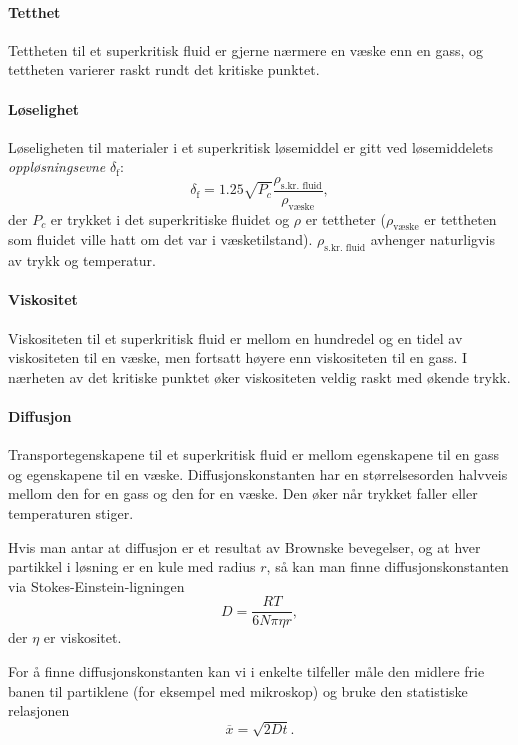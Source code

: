 \paragraph{Tetthet} Tettheten til et superkritisk fluid er gjerne nærmere en væske enn en gass, og tettheten varierer raskt rundt det kritiske punktet.

\paragraph{Løselighet} Løseligheten til materialer i et superkritisk løsemiddel er gitt ved løsemiddelets \emph{oppløsningsevne} $\delta_{\text{f}}$:
\begin{equation}
	\delta_{\text{f}} = 1.25\sqrt{P_c}\frac{\rho_{\text{s.kr. fluid}}}{\rho_{\text{væske}}},
\end{equation}
der $P_c$ er trykket i det superkritiske fluidet og $\rho$ er tettheter ($\rho_{\text{væske}}$ er tettheten som fluidet ville hatt om det var i væsketilstand). $\rho_{\text{s.kr. fluid}}$ avhenger naturligvis av trykk og temperatur.

\paragraph{Viskositet} Viskositeten til et superkritisk fluid er mellom en hundredel og en tidel av viskositeten til en væske, men fortsatt høyere enn viskositeten til en gass. I nærheten av det kritiske punktet øker viskositeten veldig raskt med økende trykk.

\paragraph{Diffusjon} Transportegenskapene til et superkritisk fluid er mellom egenskapene til en gass og egenskapene til en væske. Diffusjonskonstanten har en størrelsesorden halvveis mellom den for en gass og den for en væske. Den øker når trykket faller eller temperaturen stiger.

Hvis man antar at diffusjon er et resultat av Brownske bevegelser, og at hver partikkel i løsning er en kule med radius $r$, så kan man finne diffusjonskonstanten via Stokes-Einstein-ligningen
\begin{equation}
	D=\frac{RT}{6N\pi\eta r},
\end{equation}
der $\eta$ er viskositet. 

For å finne diffusjonskonstanten kan vi i enkelte tilfeller måle den midlere frie banen til partiklene (for eksempel med mikroskop) og bruke den statistiske relasjonen
\begin{equation}
	\overline{x} = \sqrt{2Dt}.
\end{equation}


